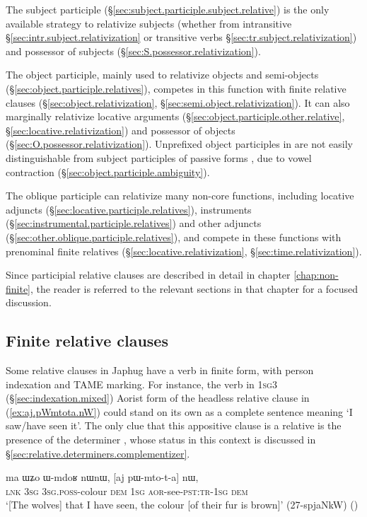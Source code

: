 The subject participle (§\ref{sec:subject.participle.subject.relative}) is the only available strategy to relativize subjects (whether from intransitive §\ref{sec:intr.subject.relativization} or transitive verbs §\ref{sec:tr.subject.relativization}) and possessor of subjects (§\ref{sec:S.possessor.relativization}).

The object participle, mainly used to relativize objects and semi-objects (§\ref{sec:object.participle.relatives}), competes in this function with finite relative clauses (§\ref {sec:object.relativization}, §\ref{sec:semi.object.relativization}). It can also marginally relativize locative arguments (§\ref{sec:object.participle.other.relative}, §\ref{sec:locative.relativization}) and possessor of objects (§\ref{sec:O.possessor.relativization}). Unprefixed object participles in  are not easily distinguishable from subject participles of passive forms , due to vowel contraction (§\ref{sec:object.participle.ambiguity}).
 
The oblique participle can relativize many non-core functions, including locative adjuncts (§\ref{sec:locative.participle.relatives}), instruments (§\ref{sec:instrumental.participle.relatives}) and other adjuncts (§\ref{sec:other.oblique.participle.relatives}), and compete in these functions with prenominal finite relatives (§\ref{sec:locative.relativization}, §\ref{sec:time.relativization}).
 
Since participial relative clauses are described in detail in chapter \ref{chap:non-finite}, the reader is referred to the relevant sections in that chapter for a focused discussion.
 
\subsection{Finite relative clauses} \label{sec:finite.relatives}
Some relative clauses in Japhug have a verb in finite form, with person indexation and TAME marking. For instance, the verb  in \textsc{1sg}\fl{}3 (§\ref{sec:indexation.mixed}) Aorist form of the headless relative clause in (\ref{ex:aj.pWmtota.nW}) could stand on its own as a complete sentence meaning `I saw/have seen it'. The only clue that this appositive clause is a relative is the presence of the determiner , whose status in this context is discussed in §\ref{sec:relative.determiners.complementizer}.

\begin{exe}
\ex \label{ex:aj.pWmtota.nW}
 \gll ma ɯʑo ɯ-mdoʁ nɯnɯ, [aj pɯ-mto-t-a] nɯ, \\
 \textsc{lnk} \textsc{3sg} \textsc{3sg}.\textsc{poss}-colour \textsc{dem} \textsc{1sg} \textsc{aor}-see-\textsc{pst}:\textsc{tr}-\textsc{1sg} \textsc{dem} \\
 \glt `[The wolves] that I have seen, the colour [of their fur is brown]' (27-spjaNkW)
()
\end{exe}

